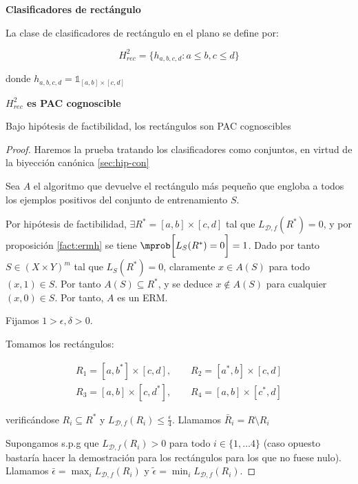 \begin{example}
  \begin{definition*} \textbf{Clasificadores de rectángulo}

  La clase de clasificadores de rectángulo en el plano se define por:

  \[H^2_{rec} = \{ h_{a,b,c,d}: a\le b, c\le d\}\]

  donde $h_{a,b,c,d} = \mathds{1}_{[a,b]\times [c,d]}$
  \end{definition*}


  \begin{fact} \textbf{$H_{rec}^2$ es PAC cognoscible}

  Bajo hipótesis de factibilidad, los rectángulos son PAC cognoscibles
  \end{fact}

    \begin{proof}
    Haremos la prueba tratando los clasificadores como conjuntos, en virtud de la biyección canónica \eqref{sec:hip-con}
    
    Sea $A$ el algoritmo que devuelve el rectángulo más pequeño que engloba a todos los ejemplos positivos del conjunto 
    de entrenamiento $S$.

    Por hipótesis de factibilidad, $\exists R^\ast = [a,b]\times [c,d]$ tal que $L_{\mathcal{D},f}(R^\ast) = 0$, y por 
    proposición \ref{fact:ermh} se tiene $\mprob \bigg[L_S(R^\ast) = 0 \bigg] = 1$. 
    Dado por tanto $S \in (X\times Y)^m$ tal que $L_S(R^\ast) = 0$, claramente $x \in A(S)$ para 
    todo $(x,1)\in S$. Por tanto $A(S) \subseteq R^\ast$, y se deduce $x \notin A(S)$ para 
    cualquier $(x,0)\in S$. Por tanto, $A$ es un ERM.

    Fijamos $1 > \epsilon, \delta > 0$.

    Tomamos los rectángulos:
    
    \begin{align*} 
    R_1 = [a,b^{\ast}] \times [c,d], \qquad R_2= [a^{\ast},b] \times [c,d] \\ 
    R_3=[a,b] \times [c,d^{\ast}],   \qquad R_4=[a,b] \times [c^{\ast},d]     
    \end{align*}
 
    verificándose $R_i \subseteq R^\ast$ y $L_{\mathcal{D},f}(R_i) \le \frac{\epsilon}{4}$. Llamamos 
    $\bar{R}_i = R\setminus R_i$
    
    Supongamos s.p.g que $L_{\mathcal{D},f}(R_i) > 0$ para todo $i\in\{1,\ldots 4\}$ (caso opuesto 
    bastaría hacer la demostración para los rectángulos para los que no fuese nulo). Llamamos 
    $\bar{\epsilon} = \max_i L_{\mathcal{D},f}(R_i)$ y $\widetilde{\epsilon} = \min_i L_{\mathcal{D},f}(R_i)$.


\end{proof}
\end{example}
